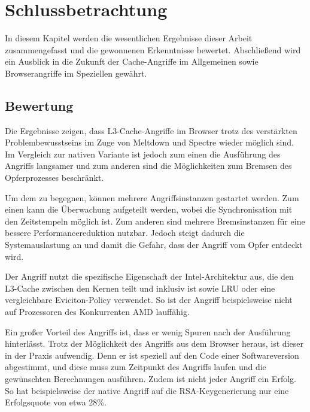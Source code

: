 \chapter{Schlussbetrachtung}
\label{chapter:conclusions}

In diesem Kapitel werden die wesentlichen Ergebnisse dieser Arbeit zusammengefasst und die gewonnenen Erkenntnisse bewertet.
Abschließend wird ein Ausblick in die Zukunft der Cache-Angriffe im Allgemeinen sowie Browserangriffe im Speziellen gewährt.

\section{Bewertung}

Die Ergebnisse zeigen, dass L3-Cache-Angriffe im Browser trotz des verstärkten Problembewusstseins im Zuge von Meltdown und Spectre wieder möglich sind.
Im Vergleich zur nativen Variante ist jedoch zum einen die Ausführung des Angriffs langsamer und zum anderen sind die Möglichkeiten zum Bremsen des Opferprozesses beschränkt.

Um dem zu begegnen, können mehrere Angriffsinstanzen gestartet werden.
Zum einen kann die Überwachung aufgeteilt werden, wobei die Synchronisation mit den Zeitstempeln möglich ist.
Zum anderen sind mehrere Bremsinstanzen für eine bessere Performancereduktion nutzbar.
Jedoch steigt dadurch die Systemauslastung an und damit die Gefahr, dass der Angriff vom Opfer entdeckt wird. 


Der Angriff nutzt die spezifische Eigenschaft der Intel-Architektur aus, die den L3-Cache zwischen den Kernen teilt und inklusiv ist sowie LRU oder eine vergleichbare Eviciton-Policy verwendet. 
So ist der Angriff beispielsweise nicht auf Prozessoren des Konkurrenten AMD lauffähig.

Ein großer Vorteil des Angriffs ist, dass er wenig Spuren nach der Ausführung hinterlässt.
Trotz der Möglichkeit des Angriffs aus dem Browser heraus, ist dieser in der Praxis 
aufwendig.
Denn er ist speziell auf den Code einer Softwareversion abgestimmt, und diese muss zum Zeitpunkt des Angriffs laufen und die gewünschten Berechnungen ausführen. 
Zudem ist nicht jeder Angriff ein Erfolg. So hat beispielsweise der native Angriff auf die RSA-Keygenerierung \cite{RSAKeyGeneration2} nur eine Erfolgsquote von etwa 28\%.

